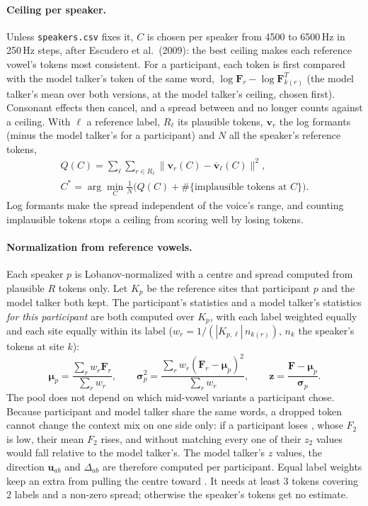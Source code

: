 \documentclass[11pt]{article}
\begin{document}
\paragraph{Ceiling per speaker.} Unless \texttt{speakers.csv} fixes it, $C$ is chosen per speaker from 4500 to 6500\,Hz in 250\,Hz steps, after Escudero et al.\ (2009): the best ceiling makes each reference vowel's tokens most consistent. For a participant, each token is first compared with the model talker's token of the same word, $\log\mathbf F_r - \log\mathbf F^T_{k(r)}$ (the model talker's mean over both versions, at the model talker's ceiling, chosen first). Consonant effects then cancel, and a spread between \textipa{[Ka]} and \textipa{[la]} no longer counts against a ceiling. With $\ell$ a reference label, $R_\ell$ its plausible tokens, $\mathbf v_r$ the log formants (minus the model talker's for a participant) and $N$ all the speaker's reference tokens,
\[
\begin{gathered}
Q(C) = \sum_\ell \sum_{r\in R_\ell} \bigl\lVert \mathbf{v}_r(C) - \overline{\mathbf{v}}_\ell(C) \bigr\rVert^2, \\
C^* = \arg\min_C \frac{1}{N}\bigl(Q(C) + \#\{\text{implausible tokens at } C\}\bigr).
\end{gathered}
\]
Log formants make the spread independent of the voice's range, and counting implausible tokens stops a ceiling from scoring well by losing tokens.

\paragraph{Normalization from reference vowels.} Each speaker $p$ is Lobanov-normalized with a centre and spread computed from plausible $R$ tokens only. Let $K_p$ be the reference sites that participant $p$ and the model talker both kept. The participant's statistics and a model talker's statistics \emph{for this participant} are both computed over $K_p$, with each label weighted equally and each site equally within its label ($w_r = 1/(|K_{p,\ell}|\,n_{k(r)})$, $n_k$ the speaker's tokens at site $k$):
\[
\boldsymbol{\mu}_p = \frac{\sum_r w_r \mathbf{F}_r}{\sum_r w_r}, \qquad
\boldsymbol{\sigma}_p^2 = \frac{\sum_r w_r (\mathbf{F}_r - \boldsymbol{\mu}_p)^2}{\sum_r w_r}, \qquad
\mathbf{z} = \frac{\mathbf{F} - \boldsymbol{\mu}_p}{\boldsymbol{\sigma}_p}.
\]
The pool does not depend on which mid-vowel variants a participant chose. Because participant and model talker share the same words, a dropped token cannot change the context mix on one side only: if a participant loses \textipa{[Ki]}, whose $F_2$ is low, their mean $F_2$ rises, and without matching every one of their $z_2$ values would fall relative to the model talker's. The model talker's $z$ values, the direction $\mathbf u_{ab}$ and $\Delta_{ab}$ are therefore computed per participant. Equal label weights keep an extra \textipa{[a]} from pulling the centre toward \textipa{[a]}. It needs at least 3 tokens covering 2 labels and a non-zero spread; otherwise the speaker's tokens get no estimate.
\end{document}
